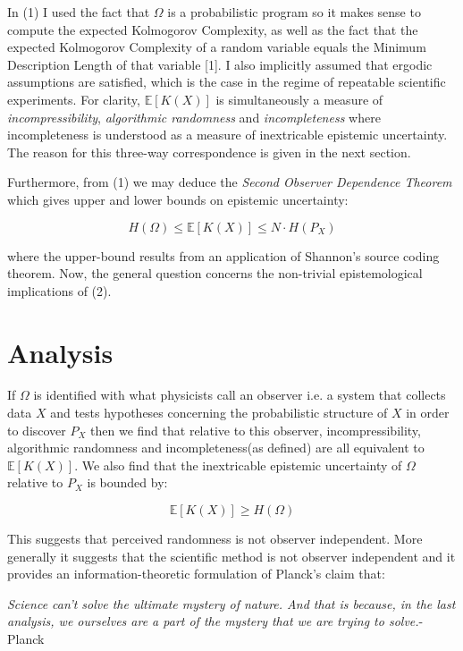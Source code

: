 \documentclass{article}
\begin{document}
In (1) I used the fact that $\Omega$ is a probabilistic program so it makes sense to compute the expected Kolmogorov Complexity, as well as the fact that the expected Kolmogorov Complexity of a random variable equals the Minimum Description Length of that variable [1]. I also implicitly assumed that ergodic assumptions are satisfied, which is the case in the regime of repeatable scientific experiments. For clarity, $\mathbb{E}[K(X)]$ is simultaneously a measure of \textit{incompressibility}, \textit{algorithmic randomness} and \textit{incompleteness} where incompleteness is understood as a measure of inextricable epistemic uncertainty. The reason for this three-way correspondence is given in the next section.

Furthermore, from (1) we may deduce the \textit{Second Observer Dependence Theorem} which gives upper and lower bounds on epistemic uncertainty:

\begin{equation}
H(\Omega) \leq \mathbb{E}[K(X)] \leq N \cdot H(P_X) \tag{2}
\end{equation}

where the upper-bound results from an application of Shannon's source coding theorem. Now, the general question concerns the
non-trivial epistemological implications of (2).

\newpage 

\section{Analysis}

If $\Omega$ is identified with what physicists call an observer i.e. a system that collects data $X$ and tests hypotheses concerning the probabilistic structure of $X$ in order to discover $P_X$ then we find that relative to this observer, incompressibility, algorithmic randomness and incompleteness(as defined) are all equivalent to $\mathbb{E}[K(X)]$. We also find that the inextricable epistemic uncertainty of $\Omega$ relative to $P_X$ is bounded by:

\begin{equation}
\mathbb{E}[K(X)] \geq H(\Omega)
\end{equation}

This suggests that perceived randomness is not observer independent. More generally it suggests that the scientific method is not observer independent and it provides an information-theoretic formulation of Planck's claim that:

\textit{Science can’t solve the ultimate mystery of nature. And that is
because, in the last analysis, we ourselves are a part of the mystery
that we are trying to solve.}-Planck
\end{document}
